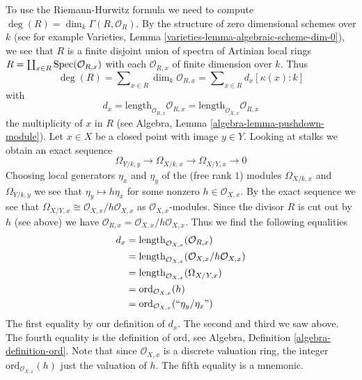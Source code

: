 \medskip\noindent
To use the Riemann-Hurwitz formula we need to compute
$\deg(R) = \dim_k \Gamma(R, \mathcal{O}_R)$. By the structure
of zero dimensional schemes over $k$ (see for example
Varieties, Lemma \ref{varieties-lemma-algebraic-scheme-dim-0}),
we see that $R$ is a finite disjoint union of spectra of
Artinian local rings $R = \coprod_{x \in R} \mathop{\mathrm{Spec}}(\mathcal{O}_{R, x})$
with each $\mathcal{O}_{R, x}$ of finite dimension over $k$. Thus
$$
\deg(R) = \sum\nolimits_{x \in R} \dim_k \mathcal{O}_{R, x} =
\sum\nolimits_{x \in R} d_x [\kappa(x) : k]
$$
with
$$
d_x = \text{length}_{\mathcal{O}_{R, x}} \mathcal{O}_{R, x} =
\text{length}_{\mathcal{O}_{X, x}} \mathcal{O}_{R, x}
$$
the multiplicity of $x$ in $R$
(see Algebra, Lemma \ref{algebra-lemma-pushdown-module}).
Let $x \in X$ be a closed point with image $y \in Y$.
Looking at stalks we obtain an exact sequence
$$
\Omega_{Y/k, y} \to \Omega_{X/k, x} \to \Omega_{X/Y, x} \to 0
$$
Choosing local generators $\eta_x$ and $\eta_y$ of the
(free rank $1$) modules $\Omega_{X/k, x}$ and $\Omega_{Y/k, y}$
we see that
$
\eta_y \mapsto h \eta_x
$
for some nonzero $h \in \mathcal{O}_{X, x}$. By the exact sequence we see that
$\Omega_{X/Y, x} \cong \mathcal{O}_{X, x}/h\mathcal{O}_{X, x}$
as $\mathcal{O}_{X, x}$-modules. Since the divisor
$R$ is cut out by $h$ (see above) we have
$\mathcal{O}_{R, x} = \mathcal{O}_{X, x}/h\mathcal{O}_{X, x}$.
Thus we find the following equalities
\begin{align*}
d_x
& =
\text{length}_{\mathcal{O}_{X, x}}(\mathcal{O}_{R, x}) \\
& =
\text{length}_{\mathcal{O}_{X, x}}(\mathcal{O}_{X, x}/h\mathcal{O}_{X, x}) \\
& =
\text{length}_{\mathcal{O}_{X, x}}(\Omega_{X/Y, x}) \\
& =
\text{ord}_{\mathcal{O}_{X, x}}(h) \\
& =
\text{ord}_{\mathcal{O}_{X, x}}(``\eta_y/\eta_x")
\end{align*}
The first equality by our definition of $d_x$. The second and third
we saw above. The fourth equality is the definition of $\text{ord}$, see
Algebra, Definition \ref{algebra-definition-ord}. Note that since
$\mathcal{O}_{X, x}$ is a discrete valuation ring, the integer
$\text{ord}_{\mathcal{O}_{X, x}}(h)$ just the valuation of $h$.
The fifth equality is a mnemonic.

